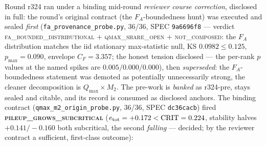 \documentclass[11pt]{article}
\theoremstyle{definition}
\theoremstyle{remark}
\begin{document}
Round r324 ran under a binding mid-round \emph{reviewer course
correction}, disclosed in full: the round's original contract (the
$F_A$-boundedness hunt) was executed and sealed \emph{first}
(\texttt{fa\_provenance\_probe.py}, 36/36, SPEC \texttt{9a6696f8}
--- verdict \textsc{fa\_bounded\_distributional} $+$
\textsc{qmax\_share\_open} $+$ \textsc{not\_composed}: the $F_A$
distribution matches the iid stationary max-statistic null, KS
$0.0982 \le 0.125$, $p_{\max} = 0.090$, envelope $C_F = 3.357$; the
honest tension disclosed --- the per-rank $p$ values at the named
spikes are $0.005/0.000/0.000$), then \emph{superseded}: the
$F_A$-boundedness statement was demoted as potentially
unnecessarily strong, the cleaner decomposition is
$Q_{\max} \times M_2$.  The pre-work is \emph{banked} as r324-pre,
stays sealed and citable, and its record is consumed as disclosed
anchors.  The binding contract
(\texttt{qmax\_m2\_origin\_probe.py}, 36/36, SPEC \texttt{dc36cacb})
fired \textbf{\textsc{pileup\_grows\_subcritical}}
($e_{\rm tot} = +0.172 < \mathrm{CRIT} = 0.224$, stability halves
$+0.141/-0.160$ both subcritical, the second \emph{falling} ---
decided; by the reviewer contract a sufficient, first-class
outcome):
\end{document}
